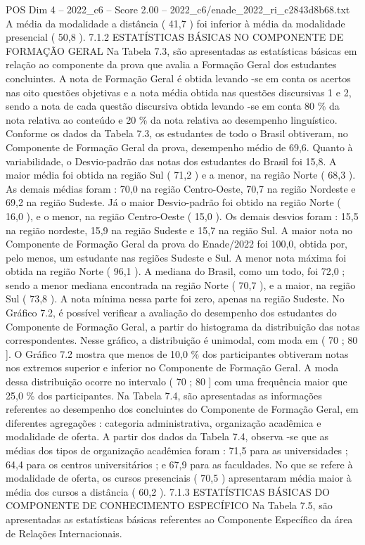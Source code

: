 \begin{textsample}{POS Dim 4 – 2022\_c6 – Score 2.00 – 2022\_c6/enade\_2022\_ri\_c2843d8b68.txt}
A média da modalidade a distância ( 41,7 ) foi inferior à média da modalidade presencial ( 50,8 ). 7.1.2 ESTATÍSTICAS BÁSICAS NO COMPONENTE DE FORMAÇÃO GERAL Na Tabela 7.3, são apresentadas as estatísticas básicas em relação ao componente da prova que avalia a Formação Geral dos estudantes concluintes.
A nota de Formação Geral é obtida levando -se em conta os acertos nas oito questões objetivas e a nota média obtida nas questões discursivas 1 e 2, sendo a nota de cada questão discursiva obtida levando -se em conta 80 \% da nota relativa ao conteúdo e 20 \% da nota relativa ao desempenho linguístico.
Conforme os dados da Tabela 7.3, os estudantes de todo o Brasil obtiveram, no Componente de Formação Geral da prova, desempenho médio de 69,6.
Quanto à variabilidade, o Desvio-padrão das notas dos estudantes do Brasil foi 15,8.
A maior média foi obtida na região Sul ( 71,2 ) e a menor, na região Norte ( 68,3 ).
As demais médias foram : 70,0 na região Centro-Oeste, 70,7 na região Nordeste e 69,2 na região Sudeste.
Já o maior Desvio-padrão foi obtido na região Norte ( 16,0 ), e o menor, na região Centro-Oeste ( 15,0 ).
Os demais desvios foram : 15,5 na região nordeste, 15,9 na região Sudeste e 15,7 na região Sul.
A maior nota no Componente de Formação Geral da prova do Enade/2022 foi 100,0, obtida por, pelo menos, um estudante nas regiões Sudeste e Sul.
A menor nota máxima foi obtida na região Norte ( 96,1 ).
A mediana do Brasil, como um todo, foi 72,0 ; sendo a menor mediana encontrada na região Norte ( 70,7 ), e a maior, na região Sul ( 73,8 ).
A nota mínima nessa parte foi zero, apenas na região Sudeste.
No Gráfico 7.2, é possível verificar a avaliação do desempenho dos estudantes do Componente de Formação Geral, a partir do histograma da distribuição das notas correspondentes.
Nesse gráfico, a distribuição é unimodal, com moda em ( 70 ; 80 ].
O Gráfico 7.2 mostra que menos de 10,0 \% dos participantes obtiveram notas nos extremos superior e inferior no Componente de Formação Geral.
A moda dessa distribuição ocorre no intervalo ( 70 ; 80 ] com uma frequência maior que 25,0 \% dos participantes.
Na Tabela 7.4, são apresentadas as informações referentes ao desempenho dos concluintes do Componente de Formação Geral, em diferentes agregações : categoria administrativa, organização acadêmica e modalidade de oferta.
A partir dos dados da Tabela 7.4, observa -se que as médias dos tipos de organização acadêmica foram : 71,5 para as universidades ; 64,4 para os centros universitários ; e 67,9 para as faculdades.
No que se refere à modalidade de oferta, os cursos presenciais ( 70,5 ) apresentaram média maior à média dos cursos a distância ( 60,2 ). 7.1.3 ESTATÍSTICAS BÁSICAS DO COMPONENTE DE CONHECIMENTO ESPECÍFICO Na Tabela 7.5, são apresentadas as estatísticas básicas referentes ao Componente Específico da área de Relações Internacionais.

\end{textsample}

